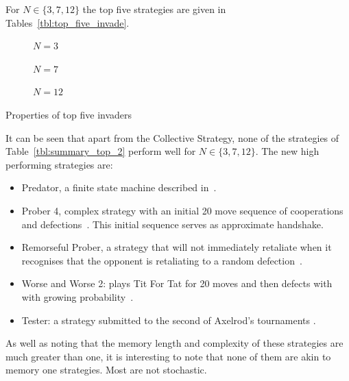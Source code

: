 \documentclass{article}
\begin{document}
For \(N\in\{3, 7, 12\}\) the top five strategies are given in
Tables~\ref{tbl:top_five_invade}.

\begin{table}[!hbtp]
    \begin{subfigure}[t]{\textwidth}
        \centering
        
        \caption{\(N=3\)}
    \end{subfigure}
    \begin{subfigure}[t]{\textwidth}
        \centering
        
        \caption{\(N=7\)}
    \end{subfigure}
    \begin{subfigure}[t]{\textwidth}
        \centering
        
        \caption{\(N=12\)}
    \end{subfigure}
    \caption{Properties of top five invaders}
    \label{tbl:top_five_invade}
\end{table}

It can be seen that apart from the Collective Strategy, none of the strategies
of Table~\ref{tbl:summary_top_2} perform well for \(N\in\{3, 7, 12\}\). The new
high performing strategies are:

\begin{itemize}
    \item Predator, a finite state machine described in~\cite{Ashlock2006}.
    \item Prober 4, complex strategy with an initial 20 move sequence of
        cooperations and defections~\cite{prison}. This initial sequence serves
        as approximate handshake.
    \item Remorseful Prober, a strategy that will not immediately retaliate when
        it recognises that the opponent is retaliating to a random
        defection~\cite{Li2011}.
    \item  Worse and Worse 2: plays Tit For Tat for 20 moves and then defects
        with with growing probability~\cite{prison}.
    \item Tester: a strategy submitted to the second of Axelrod's tournaments
        \cite{Axelrod1980b}.
\end{itemize}

As well as noting that the memory length and complexity of these strategies are
much greater than one, it is interesting to note that none of them are akin to
memory one strategies. Most are not stochastic.
\end{document}
